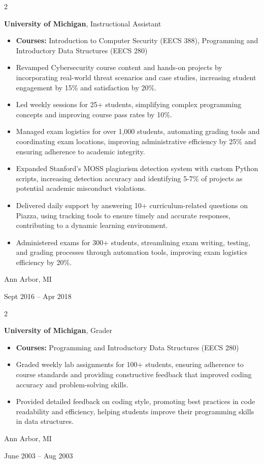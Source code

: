 \documentclass[10pt, a4paper]{article}
\newenvironment{highlights}{
    \begin{itemize}[
        topsep=0.1 cm,
        parsep=0.1 cm,
        partopsep=0pt,
        itemsep=0pt,
        leftmargin=0.2 cm + 10pt
    ]
}{
    \end{itemize}
} %
\newenvironment{twocolentry}[2][]{
    \onecolentry
    \def\secondColumn{#2}
    \setcolumnwidth{\fill, 4 cm}
    \begin{paracol}{2}
}{
    \switchcolumn \raggedleft \secondColumn
    \end{paracol}
    \endonecolentry
} %
\begin{document}
        \begin{twocolentry}{
            Ann Arbor, MI

        Sept 2016 – Apr 2018
        }
            \textbf{University of Michigan}, Instructional Assistant
            \begin{highlights}
                \item \textbf{Courses:} Introduction to Computer Security (EECS 388), Programming and Introductory Data Structures (EECS 280)
                \item Revamped Cybersecurity course content and hands-on projects by incorporating real-world threat scenarios and case studies, increasing student engagement by 15\% and satisfaction by 20\%.
                \item Led weekly sessions for 25+ students, simplifying complex programming concepts and improving course pass rates by 10\%.
                \item Managed exam logistics for over 1,000 students, automating grading tools and coordinating exam locations, improving administrative efficiency by 25\% and ensuring adherence to academic integrity.
                \item Expanded Stanford's MOSS plagiarism detection system with custom Python scripts, increasing detection accuracy and identifying 5-7\% of projects as potential academic misconduct violations.
                \item Delivered daily support by answering 10+ curriculum-related questions on Piazza, using tracking tools to ensure timely and accurate responses, contributing to a dynamic learning environment.
                \item Administered exams for 300+ students, streamlining exam writing, testing, and grading processes through automation tools, improving exam logistics efficiency by 20\%.
            \end{highlights}
        \end{twocolentry}


        \vspace{0.5 cm}

        \begin{twocolentry}{
            Ann Arbor, MI

        June 2003 – Aug 2003
        }
            \textbf{University of Michigan}, Grader
            \begin{highlights}
                \item \textbf{Courses:} Programming and Introductory Data Structures (EECS 280)
                \item Graded weekly lab assignments for 100+ students, ensuring adherence to course standards and providing constructive feedback that improved coding accuracy and problem-solving skills.
                \item Provided detailed feedback on coding style, promoting best practices in code readability and efficiency, helping students improve their programming skills in data structures.
            \end{highlights}
        \end{twocolentry}
\end{document}
